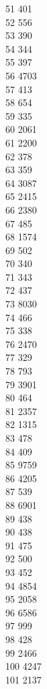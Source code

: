 { 51	401 \\
 52	556 \\
 53	390 \\
 54	344 \\
 55	397 \\
 56	4703 \\
 57	413 \\
 58	654 \\
 59	335 \\
 60	2061 \\
 61	2200 \\
 62	378 \\
 63	359 \\
 64	3087 \\
 65	2415 \\
 66	2380 \\
 67	485 \\
 68	1574 \\
 69	502 \\
 70	340 \\
 71	343 \\
 72	437 \\
 73	8030 \\
 74	466 \\
 75	338 \\
 76	2470 \\
 77	329 \\
 78	793 \\
 79	3901 \\
 80	464 \\
 81	2357 \\
 82	1315 \\
 83	478 \\
 84	409 \\
 85	9759 \\
 86	4205 \\
 87	539 \\
 88	6901 \\
 89	438 \\
 90	438 \\
 91	475 \\
 92	500 \\
 93	452 \\
 94	4854 \\
 95	2058 \\
 96	6586 \\
 97	999 \\
 98	428 \\
 99	2466 \\
 100	4247 \\
 101	2137 \\
}
